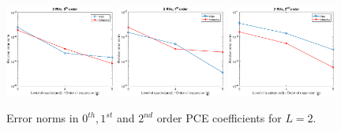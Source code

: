 \documentclass[letter,1p,11pt,oneside,onecolumn,sort&compress]{elsarticle}
\begin{document}

\begin{figure}[htbp]
\centering
 \includegraphics[width=0.32\textwidth,height=0.18\textheight]{plots/sigma04_2RN_u0_order0.eps}
 \includegraphics[width=0.32\textwidth,height=0.18\textheight]{plots/sigma04_2RN_u2_order1.eps}
 \includegraphics[width=0.32\textwidth,height=0.18\textheight]{plots/sigma04_2RN_u4_order2.eps}
 \caption{Error norms in $0^{th}, 1^{st}$ and $2^{nd}$ order PCE coefficients for $L=2$.}
 \label{fig:2RV}
\end{figure}
\end{document}
